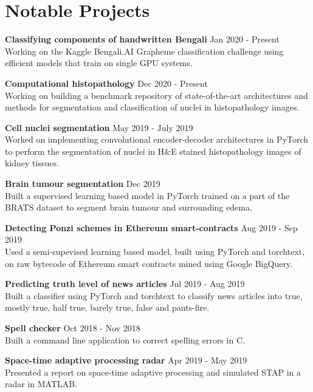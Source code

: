 \documentclass[letterpaper]{article}
\renewenvironment{itemize}{
  \begin{list}{}{
    \setlength{\leftmargin}{1.5em}
  }
}{
  \end{list}
}
\newcommand{\datefont}[1]{\textcolor{black!80}{\small{#1}}}
\begin{document}
\section*{Notable Projects}
  \begin{itemize}
    \item
    \textbf{Classifying components of handwritten Bengali}
    \hfill{\datefont{Jan 2020 - Present}}\\
    Working on the Kaggle Bengali.AI Grapheme classification challenge
    using efficient models that train on single GPU systems.

    \item
    \textbf{Computational histopathology}
    \hfill{\datefont{Dec 2020 - Present}}\\
    Working on building a benchmark repository of state-of-the-art architectures and methods for segmentation and classification of nuclei in histopathology images.

    \item
    \textbf{Cell nuclei segmentation}
    \hfill{\datefont{May 2019 - July 2019}}\\
    Worked on implementing convolutional encoder-decoder architectures in PyTorch to perform the segmentation of nuclei in H\&E stained histopathology images of kidney tissues.

    \item
    \textbf{Brain tumour segmentation}
    \hfill{\datefont{Dec 2019}}\\
    Built a supervised learning based model in PyTorch trained on a part of the BRATS dataset to segment brain tumour and surrounding edema.

    \item
    \textbf{Detecting Ponzi schemes in Ethereum smart-contracts}
    \hfill{\datefont{Aug 2019 - Sep 2019}}\\
    Used a semi-supevised learning based model, built using PyTorch and torchtext, on raw bytecode of Ethereum smart contracts mined using Google BigQuery.

    \item
    \textbf{Predicting truth level of news articles}
    \hfill{\datefont{Jul 2019 - Aug 2019}}\\
    Built a classifier using PyTorch and torchtext to classify news articles into true, mostly true, half true, barely true, false and pants-fire.

    \item
    \textbf{Spell checker}
    \hfill{\datefont{Oct 2018 - Nov 2018}}\\
    Built a command line application to correct spelling errors in C.

    \item
    \textbf{Space-time adaptive processing radar}
    \hfill{\datefont{Apr 2019 - May 2019}}\\
    Presented a report on space-time adaptive processing and simulated STAP in a radar in MATLAB.

  \end{itemize}
\end{document}
